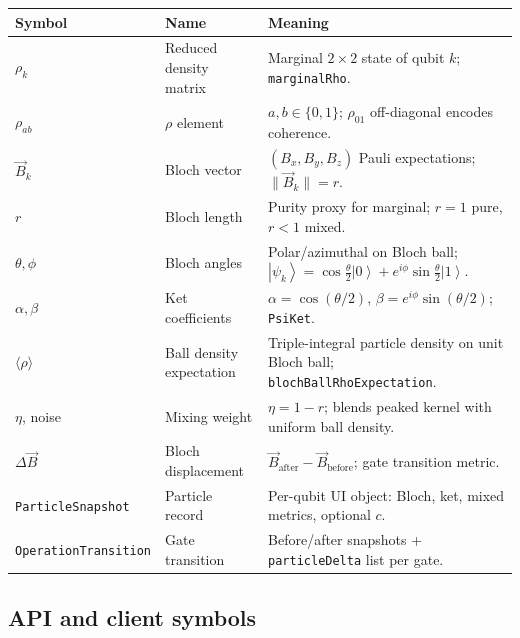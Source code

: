 \documentclass[11pt,a4paper]{article}
\newcommand{\ket}[1]{\left|#1\right\rangle}
\begin{document}
\begin{center}
\small
\begin{tabular}{@{}>{\raggedright\arraybackslash}p{3.3cm}>{\raggedright\arraybackslash}p{3.4cm}>{\raggedright\arraybackslash}p{7.2cm}@{}}
\toprule
Symbol & Name & Meaning \\
\midrule
$\rho_k$ & Reduced density matrix & Marginal $2\times2$ state of qubit $k$; \texttt{marginalRho}. \\
$\rho_{ab}$ & $\rho$ element & $a,b\in\{0,1\}$; $\rho_{01}$ off-diagonal encodes coherence. \\
$\vec{B}_k$ & Bloch vector & $(B_x,B_y,B_z)$ Pauli expectations; $\|\vec{B}_k\|=r$. \\
$r$ & Bloch length & Purity proxy for marginal; $r=1$ pure, $r<1$ mixed. \\
$\theta,\phi$ & Bloch angles & Polar/azimuthal on Bloch ball; $\ket{\psi_k}=\cos\frac{\theta}{2}\ket{0}+e^{i\phi}\sin\frac{\theta}{2}\ket{1}$. \\
$\alpha,\beta$ & Ket coefficients & $\alpha=\cos(\theta/2)$, $\beta=e^{i\phi}\sin(\theta/2)$; \texttt{PsiKet}. \\
$\langle\rho\rangle$ & Ball density expectation & Triple-integral particle density on unit Bloch ball; \texttt{blochBallRhoExpectation}. \\
$\eta$, noise & Mixing weight & $\eta=1-r$; blends peaked kernel with uniform ball density. \\
$\Delta\vec{B}$ & Bloch displacement & $\vec{B}_{\mathrm{after}}-\vec{B}_{\mathrm{before}}$; gate transition metric. \\
\texttt{ParticleSnapshot} & Particle record & Per-qubit UI object: Bloch, ket, mixed metrics, optional $c$. \\
\texttt{OperationTransition} & Gate transition & Before/after snapshots + \texttt{particleDelta} list per gate. \\
\bottomrule
\end{tabular}
\end{center}


\subsection{API and client symbols}
\end{document}

